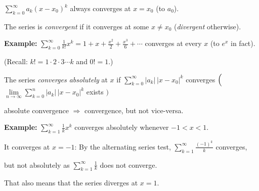 \documentclass[10pt,aspectratio=169]{beamer}
\begin{document}
\begin{frame}
$\displaystyle \sum_{k=0}^\infty a_k {(x-x_0)}^k$
\quad
always converges at $x=x_0$ (to $a_0$).

\pause
\medskip

The series is \emph{convergent}
if it converges at some $x \neq x_0$ (\emph{divergent} otherwise).

\pause
\medskip

\textbf{Example:}
\quad
$\displaystyle
\sum_{k=0}^\infty \frac{1}{k!} x^k = 
1 + x + \frac{x^2}{2} + \frac{x^3}{6} + \cdots$
\quad
converges at every $x$ (to $e^x$ in fact).

\pause
\vspace*{-8pt}

\hfill
{\small (Recall: $k! = 1\cdot 2\cdot 3 \cdots k$ and $0! = 1$.)}


\pause
The series 
\emph{converges absolutely} at $x$ if
\quad
$\displaystyle
\sum_{k=0}^\infty
\lvert a_k \rvert \, {\lvert x-x_0 \rvert}^k 
$
\quad
converges $\Bigl($ {\small $\!\displaystyle \lim\limits_{n\to\infty}
\sum\limits_{k=0}^n
\lvert a_k \rvert \, {\lvert x-x_0 \rvert}^k$ exists}
{$\!\Bigr)$}

\pause
absolute convergence $\Rightarrow$ convergence, but
not vice-versa.

\pause
\textbf{Example:}
\quad
$\displaystyle
\sum_{k=1}^\infty \frac{1}{k} x^k
$\quad
converges absolutely whenever $-1 < x < 1$.

\vspace*{-7pt}

\pause
It converges at $x=-1$:
By the alternating series test,
$\displaystyle \sum_{k=1}^\infty \frac{{(-1)}^k}{k}$ converges,

\vspace*{-7pt}

\pause
but not absolutely as $\displaystyle \sum_{k=1}^\infty \frac{1}{k}$ does not converge.

\vspace*{-7pt}

\pause
\hfill That also means that the series diverges at $x=1$.

\end{frame}
\end{document}
